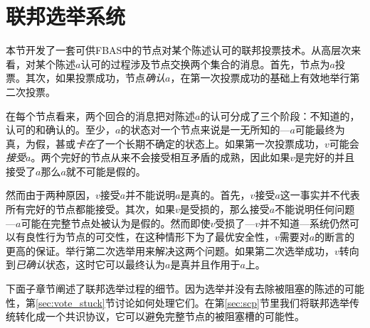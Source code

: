 \section{联邦选举系统}

本节开发了一套可供FBAS中的节点对某个陈述认可的联邦投票技术。从高层次来看，对某个陈述$a$认可的过程涉及节点交换两个集合的消息。首先，节点为$a$投票。其次，如果投票成功，节点\textit{确认}$a$，在第一次投票成功的基础上有效地举行第二次投票。

在每个节点看来，两个回合的消息把对陈述$a$的认可分成了三个阶段：不知道的，认可的和确认的。至少，$a$的状态对一个节点来说是一无所知的---$a$可能最终为真，为假，甚或\textit{卡在}了一个长期不确定的状态上。如果第一次投票成功，$v$可能会\textit{接受}$a$。两个完好的节点从来不会接受相互矛盾的成熟，因此如果$v$是完好的并且接受了$a$那么$a$就不可能是假的。

然而由于两种原因，$v$接受$a$并不能说明$a$是真的。首先，$v$接受$a$这一事实并不代表所有完好的节点都能接受。其次，如果$v$是受损的，那么接受$a$不能说明任何问题---$a$可能在完整节点处被认为是假的。然而即使$v$受损了---$v$并不知道---系统仍然可以有良性行为节点的{\quorum}可交性，在这种情形下为了最优安全性，$v$需要对$a$的断言的更高的保证。举行第二次选举用来解决这两个问题。如果第二次选举成功，$v$转向到\textit{已确认}状态，这时它可以最终认为$a$是真并且作用于$a$上。

下面子章节阐述了联邦选举过程的细节。因为选举并没有去除被阻塞的陈述的可能性，第\ref{sec:vote_stuck}节讨论如何处理它们。在第\ref{sec:scp}节里我们将联邦选举传统转化成一个共识协议，它可以避免完整节点的被阻塞槽的可能性。






